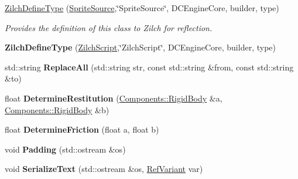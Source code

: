 \begin{DoxyCompactItemize}
\item 
\hypertarget{namespaceDCEngine_a88fd27000cf46ecb3e7c1998a9542148}{\hyperlink{namespaceDCEngine_a88fd27000cf46ecb3e7c1998a9542148}{Zilch\-Define\-Type} (\hyperlink{classDCEngine_1_1SpriteSource}{Sprite\-Source},\char`\"{}Sprite\-Source\char`\"{}, D\-C\-Engine\-Core, builder, type)}\label{namespaceDCEngine_a88fd27000cf46ecb3e7c1998a9542148}

\begin{DoxyCompactList}\small\item\em Provides the definition of this class to Zilch for reflection. \end{DoxyCompactList}\item 
\hypertarget{namespaceDCEngine_add812c17769c2e473bc67d1bd2754d05}{{\bfseries Zilch\-Define\-Type} (\hyperlink{classDCEngine_1_1ZilchScript}{Zilch\-Script},\char`\"{}Zilch\-Script\char`\"{}, D\-C\-Engine\-Core, builder, type)}\label{namespaceDCEngine_add812c17769c2e473bc67d1bd2754d05}

\item 
\hypertarget{namespaceDCEngine_a689dfa99c3966cd9a09032ddc1a0b3a3}{std\-::string {\bfseries Replace\-All} (std\-::string str, const std\-::string \&from, const std\-::string \&to)}\label{namespaceDCEngine_a689dfa99c3966cd9a09032ddc1a0b3a3}

\item 
\hypertarget{namespaceDCEngine_adaaf75b0e2f03cc6fd2ac68d8d406c98}{float {\bfseries Determine\-Restitution} (\hyperlink{classDCEngine_1_1Components_1_1RigidBody}{Components\-::\-Rigid\-Body} \&a, \hyperlink{classDCEngine_1_1Components_1_1RigidBody}{Components\-::\-Rigid\-Body} \&b)}\label{namespaceDCEngine_adaaf75b0e2f03cc6fd2ac68d8d406c98}

\item 
\hypertarget{namespaceDCEngine_a11f716282f71ca8b2386356c182b7d13}{float {\bfseries Determine\-Friction} (float a, float b)}\label{namespaceDCEngine_a11f716282f71ca8b2386356c182b7d13}

\item 
\hypertarget{namespaceDCEngine_a91d765b8b565c71355d1f958dd70003f}{void {\bfseries Padding} (std\-::ostream \&os)}\label{namespaceDCEngine_a91d765b8b565c71355d1f958dd70003f}

\item 
\hypertarget{namespaceDCEngine_a82cd4926cc0e797f4f74807cec2d5c18}{void {\bfseries Serialize\-Text} (std\-::ostream \&os, \hyperlink{classDCEngine_1_1RefVariant}{Ref\-Variant} var)}\label{namespaceDCEngine_a82cd4926cc0e797f4f74807cec2d5c18}


\end{DoxyCompactItemize}
